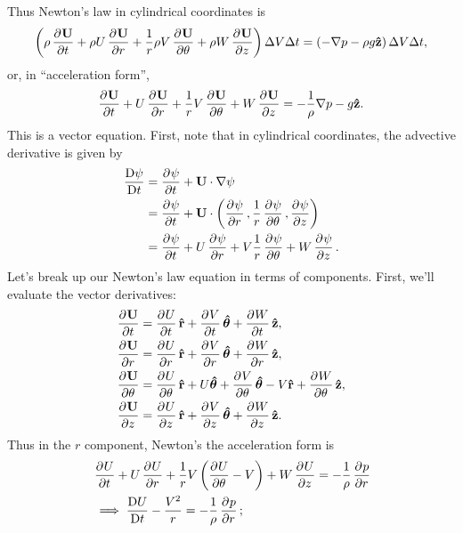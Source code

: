 \documentclass{article}
\def\*#1{\mathbf{#1}}
\newcommand{\rhat}{\mathbf{\hat{r}}}
\newcommand{\thetahat}{\boldsymbol{\hat{\theta}}}
\newcommand{\zhat}{\mathbf{\hat{z}}}
\newcommand{\dadvd}[2]{\dfrac{\text{D} #1}{\text{D} #2}} %
\begin{document}
%
Thus Newton's law in cylindrical coordinates is
%
\begin{equation*}
    \del{
        \rho \dpd{\*U}{t}
        + \rho U \dpd{\*U}{r}
        + \frac{1}{r} \rho V \dpd{\*U}{\theta}
        + \rho W \dpd{\*U}{z}
    } \Delta V \Delta t
    =
    \del{- \nabla p - \rho g \zhat} \Delta V \Delta t
    ,
\end{equation*}
%
or, in ``acceleration form'',
%
\begin{equation*}
    \dpd{\*U}{t}
    + U \dpd{\*U}{r}
    + \frac{1}{r} V \dpd{\*U}{\theta}
    + W \dpd{\*U}{z}
    =
    - \frac{1}{\rho} \nabla p - g \zhat
    .
\end{equation*}
%
This is a vector equation. First, note that in cylindrical coordinates,
the advective derivative is given by
%
\begin{align*}
    \dadvd{\psi}{t}
        &= \dpd{\psi}{t} + \*U \cdot \nabla \psi \\
        &= \dpd{\psi}{t} + \*U \cdot
            \del{
                \dpd{\psi}{r},
                \frac{1}{r} \dpd{\psi}{\theta},
                \dpd{\psi}{z}
            } \\
        &=
            \dpd{\psi}{t}
            + U \dpd{\psi}{r}
            + V \frac{1}{r} \dpd{\psi}{\theta}
            + W \dpd{\psi}{z}
        .
\end{align*}
%
Let's break up our Newton's law equation in terms of components.
First, we'll evaluate the vector derivatives:
%
\begin{align*}
    \dpd{\*U}{t} &= \dpd{U}{t} \rhat + \dpd{V}{t} \thetahat + \dpd{W}{t} \zhat, \\
    \dpd{\*U}{r}
        &= \dpd{U}{r} \rhat
            + \dpd{V}{r} \thetahat
            + \dpd{W}{r} \zhat
    ,
    \\
    \dpd{\*U}{\theta}
        &= \dpd{U}{\theta} \rhat
            + U \thetahat
            + \dpd{V}{\theta} \thetahat
            - V \rhat
            + \dpd{W}{\theta} \zhat
    ,
    \\
    \dpd{\*U}{z} &= \dpd{U}{z} \rhat + \dpd{V}{z} \thetahat + \dpd{W}{z} \zhat
    .
\end{align*}
%
Thus in the $r$ component, Newton's the acceleration form is
%
\begin{align*}
    &\dpd{U}{t}
    + U \dpd{U}{r}
    + \frac{1}{r} V \del{\dpd{U}{\theta} - V}
    + W \dpd{U}{z}
    =
    - \frac{1}{\rho} \dpd{p}{r}
    \\
    &\implies
    \dadvd{U}{t} - \frac{V^2}{r}
    =
    - \frac{1}{\rho} \dpd{p}{r}
    ;
\end{align*}
\end{document}
